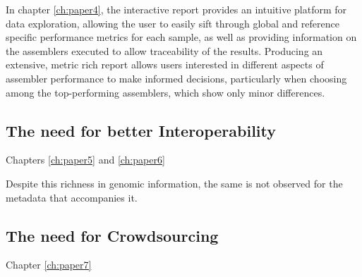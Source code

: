 In chapter \ref{ch:paper4}, the interactive report provides an intuitive platform for data exploration, allowing the user to easily sift through global and reference specific performance metrics for each sample, as well as providing information on the assemblers executed to allow traceability of the results. Producing an extensive, metric rich report allows users interested in different aspects of assembler performance to make informed decisions, particularly when choosing among the top-performing assemblers, which show only minor differences.



\subsection{The need for better Interoperability}

Chapters \ref{ch:paper5} and \ref{ch:paper6}

Despite this richness in genomic information, the same is not observed for the metadata that accompanies it. 

\subsection{The need for Crowdsourcing}

Chapter \ref{ch:paper7}